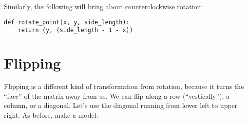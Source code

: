 \documentclass[12pt]{scrartcl}
\begin{document}
Similarly, the following will bring about counterclockwise rotation:

\begin{lstlisting}
def rotate_point(x, y, side_length):
    return (y, (side_length - 1 - x))
\end{lstlisting}


\section{Flipping}

Flipping is a different kind of transformation from rotation, because it turns the ``face'' of the matrix away from us. We can flip along a row (``vertically''), a column, or a diagonal. Let's use the diagonal running from lower left to upper right. As before, make a model:
\end{document}
